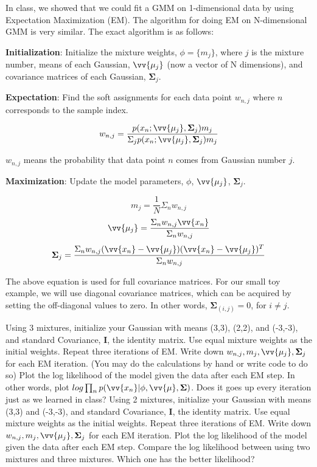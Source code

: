 \documentclass{article}
\newcounter{question}
\begin{document}
In class, we showed that we could fit a GMM on 1-dimensional data by using Expectation Maximization (EM). The algorithm for doing EM on N-dimensional GMM is very similar. The exact algorithm is as follows:

\textbf{Initialization}: Initialize the mixture weights, $\phi = \{m_j\}$, where $j$ is the mixture number, means of each Gaussian, $\vv{\mu_j}$  (now a vector of N dimensions), and covariance matrices of each Gaussian, $\mathbf{\Sigma}_j$.

\textbf{Expectation}: Find the soft assignments for each data point $w_{n,j}$ where $n$ corresponds to the sample index.

\begin{equation}
w_{n,j} = \frac{p(x_n; \vv{\mu_j}, \mathbf{\Sigma}_j)m_j}
 {\Sigma_j p(x_n; \vv{\mu_j}, \mathbf{\Sigma}_j)m_j}
\end{equation}

$w_{n,j}$ means the probability that data point $n$ comes from Gaussian number $j$.

\textbf{Maximization}: Update the model parameters, $\phi$, $\vv{\mu_j}$, $\mathbf{\Sigma}_j$.

\begin{equation}
m_j = \frac{1}{N}\Sigma_{n} w_{n,j}
\end{equation}
\begin{equation}
\vv{\mu_j} = \frac{\Sigma_{n} w_{n,j}\vv{x_n}}{\Sigma_{n}w_{n,j}}
\end{equation}
\begin{equation}
\mathbf{\Sigma}_j = \frac{\Sigma_{n} w_{n,j}(\vv{x_n}-\vv{\mu_j})(\vv{x_n}-\vv{\mu_j})^T}{\Sigma_{n}w_{n,j}}
\end{equation}

The above equation is used for full covariance matrices. For our small toy example, we will use diagonal covariance matrices, which can be acquired by setting the off-diagonal values to zero. In other words, $\mathbf{\Sigma}_{(i,j)} = 0$, for $i \ne j$.

\question Using 3 mixtures, initialize your Gaussian with means (3,3), (2,2), and (-3,-3), and standard Covariance, $\mathbf{I}$, the identity matrix. Use equal mixture weights as the initial weights. Repeat three iterations of EM. Write down $w_{n,j}, m_j, \vv{\mu_j}, \mathbf{\Sigma}_j$ for each EM iteration. (You may do the calculations by hand or write code to do so)
\question Plot the log likelihood of the model given the data after each EM step. In other words, plot $log \prod_n p(\vv{x_n}| \phi, \vv{\mu}, \mathbf{\Sigma})$. Does it goes up every iteration just as we learned in class?
\question Using 2 mixtures, initialize your Gaussian with means (3,3) and (-3,-3), and standard Covariance, $\mathbf{I}$, the identity matrix. Use equal mixture weights as the initial weights. Repeat three iterations of EM. Write down $w_{n,j}, m_j, \vv{\mu_j}, \mathbf{\Sigma}_j$ for each EM iteration.
\question Plot the log likelihood of the model given the data after each EM step. Compare the log likelihood between using two mixtures and three mixtures. Which one has the better likelihood?
\end{document}
